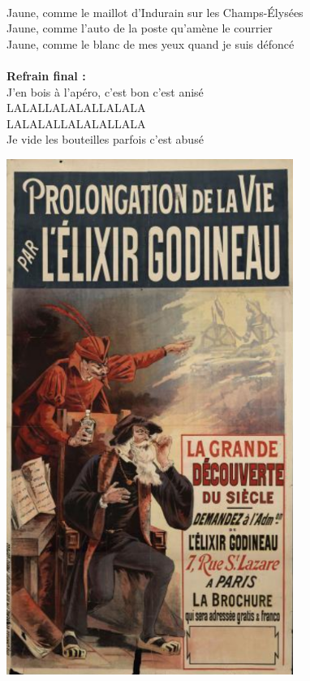 \\Jaune, comme le maillot d'Indurain sur les Champs-Élysées
\\Jaune, comme l'auto de la poste qu'amène le courrier
\\Jaune, comme le blanc de mes yeux quand je suis défoncé
\\\\\textbf{Refrain final :}
\\J'en bois à l'apéro, c'est bon c'est anisé
\\LALALLALALALLALALA
\\LALALALLALALALLALA
\\Je vide les bouteilles parfois c'est abusé
\bigskip
\bigskip
\bigskip
\begin{center}
\includegraphics[width=0.7\textwidth]{images/brev77.png}
\end{center}
\breakpage